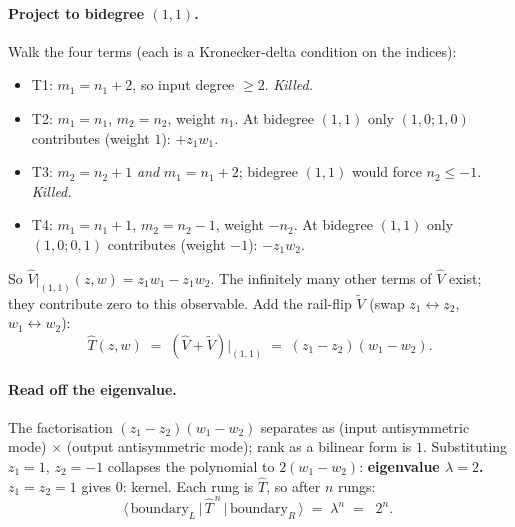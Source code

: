 \documentclass[11pt,a4paper]{article}
\begin{document}
\paragraph{Project to bidegree $(1,1)$.}
Walk the four terms (each is a Kronecker-delta condition on the indices):
\begin{itemize}[leftmargin=2em,itemsep=1pt]
  \item T1: $m_1{=}n_1{+}2$, so input degree $\ge 2$. \emph{Killed.}
  \item T2: $m_1{=}n_1$, $m_2{=}n_2$, weight $n_1$. At bidegree $(1,1)$ only $(1,0;1,0)$ contributes (weight $1$): $+z_1 w_1$.
  \item T3: $m_2{=}n_2{+}1$ \emph{and} $m_1{=}n_1{+}2$; bidegree $(1,1)$ would force $n_2 \le -1$. \emph{Killed.}
  \item T4: $m_1{=}n_1{+}1$, $m_2{=}n_2{-}1$, weight $-n_2$. At bidegree $(1,1)$ only $(1,0;0,1)$ contributes (weight $-1$): $-z_1 w_2$.
\end{itemize}
So $\widehat V|_{(1,1)}(z,w) = z_1 w_1 - z_1 w_2$.  The infinitely many other
terms of $\widehat V$ exist; they contribute zero to this observable.  Add the
rail-flip $\widetilde V$ (swap $z_1\!\leftrightarrow\!z_2$,
$w_1\!\leftrightarrow\!w_2$):
\[
\boxed{\;\widehat T(z,w) \;=\; (\widehat V + \widetilde V)\big|_{(1,1)}
\;=\; (z_1 - z_2)(w_1 - w_2).\;}
\]

\paragraph{Read off the eigenvalue.}
The factorisation $(z_1-z_2)(w_1-w_2)$ separates as (input antisymmetric mode)
$\times$ (output antisymmetric mode); rank as a bilinear form is $1$.
Substituting $z_1{=}1,\,z_2{=}{-}1$ collapses the polynomial to $2(w_1 - w_2)$:
\textbf{eigenvalue $\lambda = 2$.}  $z_1{=}z_2{=}1$ gives $0$: kernel.  Each
rung is $\widehat T$, so after $n$ rungs:
\[
\big\langle\,\text{boundary}_L\,\big|\,\widehat T^{\,n}\,\big|\,\text{boundary}_R\,\big\rangle
\;=\; \lambda^n \;=\; \boxed{\;2^n.\;}
\]
\end{document}
